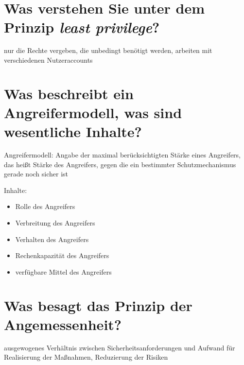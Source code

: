 \documentclass{article}
\begin{document}
	\section*{Was verstehen Sie unter dem Prinzip \textit{least privilege}?}
	nur die Rechte vergeben, die unbedingt benötigt werden, arbeiten mit verschiedenen Nutzeraccounts
	
	\section*{Was beschreibt ein Angreifermodell, was sind wesentliche Inhalte?}
	Angreifermodell: Angabe der maximal berücksichtigten Stärke eines Angreifers, das heißt Stärke des Angreifers, gegen die ein bestimmter Schutzmechanismus gerade noch sicher ist
	
	Inhalte:
	\begin{itemize}
		\item Rolle des Angreifers
		\item Verbreitung des Angreifers
		\item Verhalten des Angreifers
		\item Rechenkapazität des Angreifers
		\item verfügbare Mittel des Angreifers
	\end{itemize}
	
	\section*{Was besagt das Prinzip der Angemessenheit?}
	ausgewogenes Verhältnis zwischen Sicherheitsanforderungen und Aufwand für Realisierung der Maßnahmen, Reduzierung der Risiken
\end{document}
